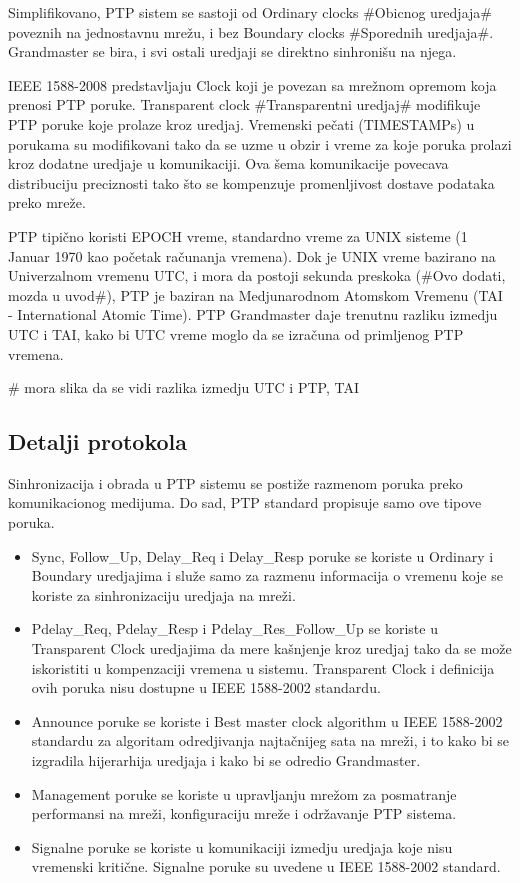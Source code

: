 \documentclass[a4paper,12pt, master]{etf}
\begin{document}
	Simplifikovano, PTP sistem se sastoji od Ordinary clocks \#Obicnog
	uredjaja\# poveznih na jednostavnu mre\v{z}u, i bez Boundary clocks
	\#Sporednih uredjaja\#. Grandmaster se bira, i svi ostali uredjaji se
	direktno sinhroni\v{s}u na njega.

	IEEE 1588-2008 predstavljaju Clock koji je povezan sa mre\v{z}nom opremom
	koja prenosi PTP poruke. Transparent clock \#Transparentni uredjaj\#
	modifikuje PTP poruke koje prolaze kroz uredjaj. Vremenski pe\v{c}ati
	(TIMESTAMPs) u porukama su modifikovani tako da se uzme u obzir i vreme za
	koje poruka prolazi kroz dodatne uredjaje u komunikaciji. Ova \v{s}ema
	komunikacije povecava distribuciju preciznosti tako \v{s}to se kompenzuje
	promenljivost dostave podataka preko mre\v{z}e.

	PTP tipi\v{c}no koristi EPOCH vreme, standardno vreme za UNIX sisteme (1
	Januar 1970 kao po\v{c}etak ra\v{c}unanja vremena). Dok je UNIX vreme
	bazirano na Univerzalnom vremenu UTC, i mora da postoji sekunda preskoka
	(\#Ovo dodati, mozda u uvod\#), PTP je baziran na Medjunarodnom Atomskom
	Vremenu (TAI - International Atomic Time). PTP Grandmaster daje	trenutnu
	razliku izmedju UTC i TAI, kako bi UTC vreme moglo da se izra\v{c}una od
	primljenog PTP vremena.

	\# mora slika da se vidi razlika izmedju UTC i PTP, TAI

	\subsection{Detalji protokola}

	Sinhronizacija i obrada u PTP sistemu se posti\v{z}e razmenom poruka preko
	komunikacionog medijuma. Do sad, PTP standard propisuje samo ove tipove
	poruka.

	\begin{itemize}
		\item Sync, Follow\_Up, Delay\_Req i Delay\_Resp poruke se koriste u
		Ordinary i Boundary uredjajima i slu\v{z}e samo za razmenu informacija
		o vremenu koje se koriste za sinhronizaciju uredjaja na mre\v{z}i.
		\item Pdelay\_Req, Pdelay\_Resp i Pdelay\_Res\_Follow\_Up se koriste u
		Transparent Clock uredjajima da mere ka\v{s}njenje kroz uredjaj tako da
		se mo\v{z}e iskoristiti u kompenzaciji vremena u sistemu. Transparent
		Clock i definicija ovih poruka nisu dostupne u IEEE 1588-2002 standardu.
		\item Announce poruke se koriste i Best master clock algorithm u IEEE
		1588-2002 standardu za algoritam odredjivanja najta\v{c}nijeg sata na
		mre\v{z}i, i to kako bi se izgradila hijerarhija uredjaja i kako bi se
		odredio Grandmaster.
		\item Management poruke se koriste u upravljanju mre\v{z}om za
		posmatranje performansi na mre\v{z}i, konfiguraciju mre\v{z}e i
		odr\v{z}avanje PTP sistema.
		\item Signalne poruke se koriste u komunikaciji izmedju uredjaja koje
		nisu vremenski kriti\v{c}ne. Signalne poruke su uvedene u IEEE
		1588-2002 standard.
	\end{itemize}
\end{document}
